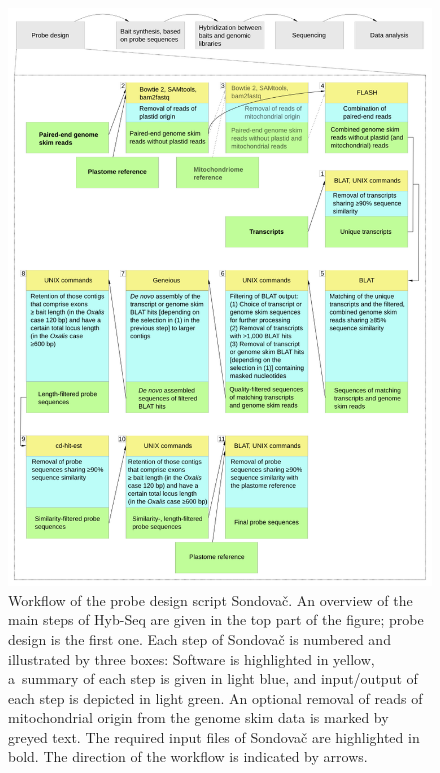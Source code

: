 \documentclass[a4paper, 11pt, twoside]{article}
\begin{document}
\begin{figure}[p]
\begin{center}
\includegraphics[width=15.5cm]{pipeline_workflow.png}
\end{center}
\caption[Workflow of the probe design script Sondovač]{Workflow of the probe design script Sondovač. An overview of the main steps of Hyb-Seq are given in the top part of the figure; probe design is the first one. Each step of Sondovač is numbered and illustrated by three boxes: Software is highlighted in yellow, a~summary of each step is given in light blue, and input/output of each step is depicted in light green. An optional removal of reads of mitochondrial origin from the genome skim data is marked by greyed text. The required input files of Sondovač are highlighted in bold. The direction of the workflow is indicated by arrows.}
\label{pipeline-workflow}
\end{figure}
\end{document}
